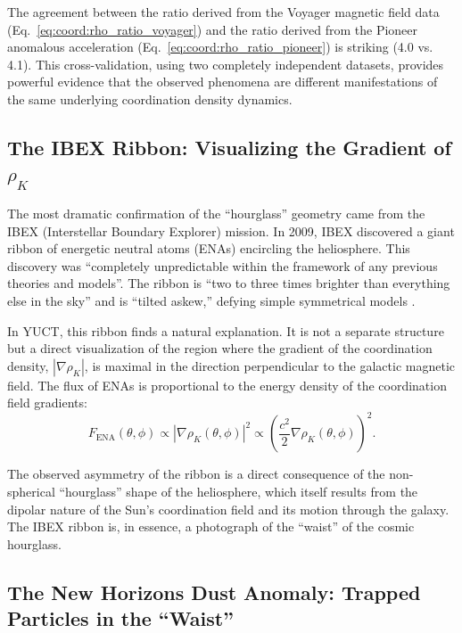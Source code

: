 \documentclass[12pt,a4paper]{article}
\theoremstyle{remark}
\begin{document}
	The agreement between the ratio derived from the Voyager magnetic field data (Eq.~\eqref{eq:coord:rho_ratio_voyager}) and the ratio derived from the Pioneer anomalous acceleration (Eq.~\eqref{eq:coord:rho_ratio_pioneer}) is striking (4.0 vs. 4.1). This cross-validation, using two completely independent datasets, provides powerful evidence that the observed phenomena are different manifestations of the same underlying coordination density dynamics.
	
	\subsection{The IBEX Ribbon: Visualizing the Gradient of \(\rho_K\)}
	\label{subsec:coord:ibex}
	
	The most dramatic confirmation of the ``hourglass'' geometry came from the IBEX (Interstellar Boundary Explorer) mission. In 2009, IBEX discovered a giant ribbon of energetic neutral atoms (ENAs) encircling the heliosphere. This discovery was ``completely unpredictable within the framework of any previous theories and models''. The ribbon is ``two to three times brighter than everything else in the sky'' and is ``tilted askew,'' defying simple symmetrical models .
	
	In YUCT, this ribbon finds a natural explanation. It is not a separate structure but a direct visualization of the region where the gradient of the coordination density, \(|\nabla \rho_K|\), is maximal in the direction perpendicular to the galactic magnetic field. The flux of ENAs is proportional to the energy density of the coordination field gradients:
	\begin{equation}
		F_{\text{ENA}}(\theta, \phi) \propto |\nabla \rho_K(\theta, \phi)|^2 \propto \left( \frac{c^2}{2} \nabla \rho_K(\theta, \phi) \right)^2.
		\label{eq:coord:ibex_flux}
	\end{equation}
	
	The observed asymmetry of the ribbon is a direct consequence of the non-spherical ``hourglass'' shape of the heliosphere, which itself results from the dipolar nature of the Sun's coordination field and its motion through the galaxy. The IBEX ribbon is, in essence, a photograph of the ``waist'' of the cosmic hourglass.
	
	\subsection{The New Horizons Dust Anomaly: Trapped Particles in the ``Waist''}
	\label{subsec:coord:newhorizons}
	
\end{document}
